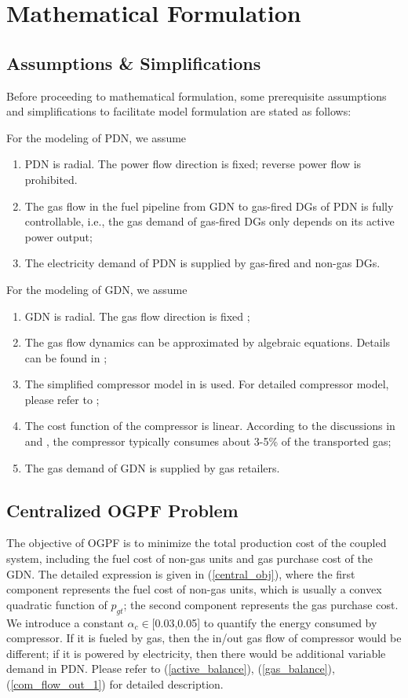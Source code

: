 \documentclass[journal]{IEEEtran}
\begin{document}
\section{Mathematical Formulation}
\subsection{Assumptions \& Simplifications}

Before proceeding to mathematical formulation, some prerequisite assumptions and simplifications to facilitate model formulation are stated as follows:

For the modeling of PDN, we assume
\begin{enumerate}
\item PDN is radial. The power flow direction is fixed; reverse power flow is prohibited.
\item The gas flow in the fuel pipeline from GDN to gas-fired DGs of PDN is fully controllable, i.e., the gas demand of gas-fired DGs only depends on its active power output;
\item The electricity demand of PDN is supplied by gas-fired and non-gas DGs.
\end{enumerate}

For the modeling of GDN, we assume
\begin{enumerate}
\item GDN is radial. The gas flow direction is fixed \cite{Nico_SingleDirection};
\item The gas flow dynamics can be approximated by algebraic equations. Details can be found in \cite{CorreaPosada2015};
\item The simplified compressor model in \cite{Wolf_BNG} is used. For detailed compressor model, please refer to \cite{Cong_Dispatch};
\item The cost function of the compressor is linear. According to the discussions in \cite{Wu_3-5} and \cite{Conrado_3-5}, the compressor typically consumes about 3-5\% of the transported gas;
\item The gas demand of GDN is supplied by gas retailers.
\end{enumerate}

\subsection{Centralized OGPF Problem}

The objective of OGPF is to minimize the total production cost of the coupled system, including the fuel cost of non-gas units and gas purchase cost of the GDN. The detailed expression is given in (\ref{central_obj}), where the first component represents the fuel cost of non-gas units, which is usually a convex quadratic function of $p_{gt}$; the second component represents the gas purchase cost. We introduce a constant $\alpha_{c}\in$[0.03,0.05] to quantify the energy consumed by compressor. If it is fueled by gas, then the in/out gas flow of compressor would be different; if it is powered by electricity, then there would be additional variable demand in PDN. Please refer to (\ref{active_balance}), (\ref{gas_balance}), (\ref{com_flow_out_1}) for detailed description.
\end{document}
